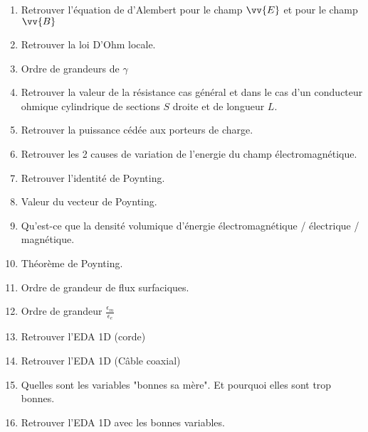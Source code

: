 \documentclass[a4paper, 11pt, hidelinks]{article}
\begin{document}
\begin{enumerate}
    \item Retrouver l'équation de d'Alembert pour le champ $\vv{E}$ et pour le champ $\vv{B}$ \cite{Chapitre13}
    \item Retrouver la loi D'Ohm locale. \cite{Chapitre14}
    \item Ordre de grandeurs de $\gamma$ \cite{Chapitre14}
    \item Retrouver la valeur de la résistance cas général et dans le cas d'un conducteur ohmique cylindrique de sections $S$ droite et de longueur $L$. \cite{Chapitre14}
    \item Retrouver la puissance cédée aux porteurs de charge. \cite{Chapitre14}
    \item Retrouver les 2 causes de variation de l'energie du champ électromagnétique. \cite{Chapitre14}
    \item Retrouver l'identité de Poynting. \cite{Chapitre14}
    \item Valeur du vecteur de Poynting. \cite{Chapitre14}
    \item Qu'est-ce que la densité volumique d'énergie électromagnétique / électrique / magnétique. \cite{Chapitre14}
    \item Théorème de Poynting. \cite{Chapitre14}
    \item Ordre de grandeur de flux surfaciques. \cite{Chapitre14}
    \item Ordre de grandeur $\frac{\epsilon_m}{\epsilon_e}$ \cite{Chapitre14}
    \item Retrouver l'EDA 1D (corde) \cite{Chapitre15}
    \item Retrouver l'EDA 1D (Câble coaxial) \cite{Chapitre15}
    \item Quelles sont les variables "bonnes sa mère". Et pourquoi elles sont trop bonnes. \cite{Chapitre15}
    \item Retrouver l'EDA 1D avec les bonnes variables. \cite{Chapitre15}
\end{enumerate}








\end{document}

